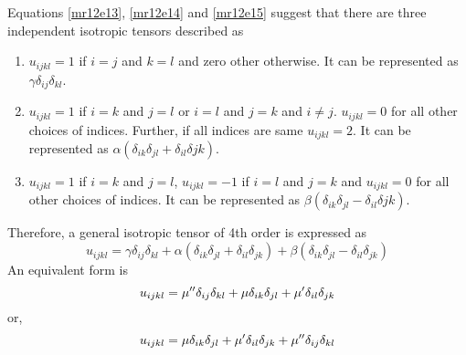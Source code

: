 \begin{itemize}
Equations \eqref{mr12e13}, \eqref{mr12e14} and \eqref{mr12e15} suggest that there are three independent isotropic tensors described as
\begin{enumerate}
\item $u_{ijkl} = 1$ if $i=j$ and $k=l$ and zero other otherwise. It can be represented as $\gamma\delta_{ij}\delta_{kl}$.
\item $u_{ijkl} = 1$ if $i=k$ and $j=l$ or $i=l$ and $j=k$ and $i \ne j$. $u_{ijkl} = 0$ for all other choices of indices. Further, if all indices are same $u_{ijkl} = 2$. It can be 
represented as $\alpha(\delta_{ik}\delta_{jl} + \delta_{il}\delta{jk})$.
\item $u_{ijkl} = 1$ if $i=k$ and $j=l$, $u_{ijkl} = -1$ if $i=l$ and $j=k$ and $u_{ijkl} = 0$ for all other choices of indices. It can be represented as $\beta(\delta_{ik}\delta_{jl} - 
\delta_{il}\delta{jk})$.
\end{enumerate}
Therefore, a general isotropic tensor of 4th order is expressed as
\begin{equation}\label{mr12e17}
u_{ijkl} = \gamma\delta_{ij}\delta_{kl} + \alpha(\delta_{ik}\delta_{jl} + \delta_{il}\delta_{jk}) + \beta(\delta_{ik}\delta_{jl} - \delta_{il}\delta_{jk})
\end{equation}
An equivalent form is
\[
u_{ijkl} = \mu^{\prime\prime}\delta_{ij}\delta_{kl} + \mu\delta_{ik}\delta_{jl} + \mu^\prime\delta_{il}\delta_{jk}
\]
or,
\begin{equation}\label{mr12e18}
u_{ijkl} = \mu\delta_{ik}\delta_{jl} + \mu^\prime\delta_{il}\delta_{jk} + \mu^{\prime\prime}\delta_{ij}\delta_{kl}
\end{equation}
\end{itemize}


